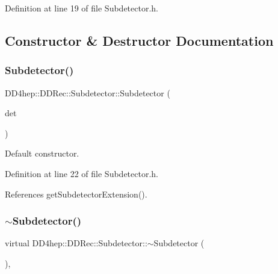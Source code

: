 Definition at line 19 of file Subdetector.\+h.



\subsection{Constructor \& Destructor Documentation}
\hypertarget{class_d_d4hep_1_1_d_d_rec_1_1_subdetector_a2583b3d4d1bb2a6bcf8bb711e840bb05}{}\label{class_d_d4hep_1_1_d_d_rec_1_1_subdetector_a2583b3d4d1bb2a6bcf8bb711e840bb05} 
\subsubsection{\texorpdfstring{Subdetector()}{Subdetector()}}
{\footnotesize\ttfamily D\+D4hep\+::\+D\+D\+Rec\+::\+Subdetector\+::\+Subdetector (\begin{DoxyParamCaption}\item[{const \hyperlink{class_d_d4hep_1_1_geometry_1_1_det_element}{Geometry\+::\+Det\+Element} \&}]{det }\end{DoxyParamCaption})\hspace{0.3cm}{\ttfamily [inline]}}



Default constructor. 



Definition at line 22 of file Subdetector.\+h.



References get\+Subdetector\+Extension().

\hypertarget{class_d_d4hep_1_1_d_d_rec_1_1_subdetector_afae5c6780ba1bd9a99b49e9ee6618ee8}{}\label{class_d_d4hep_1_1_d_d_rec_1_1_subdetector_afae5c6780ba1bd9a99b49e9ee6618ee8} 
\subsubsection{\texorpdfstring{$\sim$\+Subdetector()}{~Subdetector()}}
{\footnotesize\ttfamily virtual D\+D4hep\+::\+D\+D\+Rec\+::\+Subdetector\+::$\sim$\+Subdetector (\begin{DoxyParamCaption}{ }\end{DoxyParamCaption})\hspace{0.3cm}{\ttfamily [inline]}, {\ttfamily [virtual]}}



